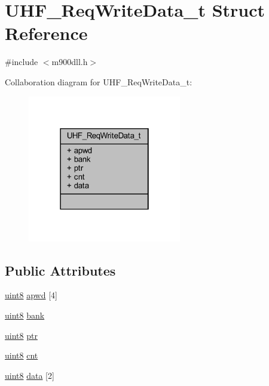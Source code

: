 \hypertarget{struct_u_h_f___req_write_data__t}{}\section{U\+H\+F\+\_\+\+Req\+Write\+Data\+\_\+t Struct Reference}
\label{struct_u_h_f___req_write_data__t}


{\ttfamily \#include $<$m900dll.\+h$>$}



Collaboration diagram for U\+H\+F\+\_\+\+Req\+Write\+Data\+\_\+t\+:
\nopagebreak
\begin{figure}[H]
\begin{center}
\leavevmode
\includegraphics[width=190pt]{struct_u_h_f___req_write_data__t__coll__graph}
\end{center}
\end{figure}
\subsection*{Public Attributes}
\begin{DoxyCompactItemize}
\item 
\mbox{\hyperlink{m900dll_8h_adde6aaee8457bee49c2a92621fe22b79}{uint8}} \mbox{\hyperlink{struct_u_h_f___req_write_data__t_a381cfdd08ad6463d915505bcc7008e71}{apwd}} \mbox{[}4\mbox{]}
\item 
\mbox{\hyperlink{m900dll_8h_adde6aaee8457bee49c2a92621fe22b79}{uint8}} \mbox{\hyperlink{struct_u_h_f___req_write_data__t_a747e39472468f4f5acaeb6ec20981903}{bank}}
\item 
\mbox{\hyperlink{m900dll_8h_adde6aaee8457bee49c2a92621fe22b79}{uint8}} \mbox{\hyperlink{struct_u_h_f___req_write_data__t_a9da7e2da4c8df6ab2ca509e199a53e5a}{ptr}}
\item 
\mbox{\hyperlink{m900dll_8h_adde6aaee8457bee49c2a92621fe22b79}{uint8}} \mbox{\hyperlink{struct_u_h_f___req_write_data__t_a8db40f1de89cca3e2fc81f9bc1ff3db8}{cnt}}
\item 
\mbox{\hyperlink{m900dll_8h_adde6aaee8457bee49c2a92621fe22b79}{uint8}} \mbox{\hyperlink{struct_u_h_f___req_write_data__t_ab182a04b178f2df43f7a88ef8e5166f7}{data}} \mbox{[}2\mbox{]}
\end{DoxyCompactItemize}


